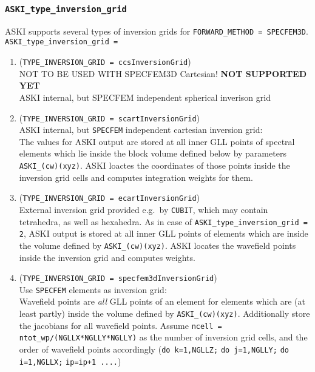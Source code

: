 \documentclass[12pt,a4paper]{article}
\newcommand{\lcode}[1]{\nolinkurl{#1}}
\newcommand{\ASKI}{ {\ttfamily ASKI} }
\begin{document}
\subsubsection*{\lcode{ASKI_type_inversion_grid}}
ASKI supports several types of inversion grids for \lcode{FORWARD_METHOD = SPECFEM3D}.
\lcode{ASKI_type_inversion_grid = }
\begin{enumerate}
\item (\lcode{TYPE_INVERSION_GRID = ccsInversionGrid}) \\ 
  NOT TO BE USED WITH SPECFEM3D Cartesian! {\bf NOT SUPPORTED YET}\\
  ASKI internal, but SPECFEM independent spherical inverison grid
\item (\lcode{TYPE_INVERSION_GRID = scartInversionGrid})\\
  \ASKI internal, but \lcode{SPECFEM} independent cartesian inversion grid:\\
  The values for \ASKI output are stored at all inner GLL points of spectral elements which lie
  inside the block volume defined below by parameters \lcode{ASKI_(cw)(xyz)}.
  \ASKI loactes the coordinates of those points inside the inversion grid cells and computes
  integration weights for them.
\item (\lcode{TYPE_INVERSION_GRID = ecartInversionGrid}) \\
  External inversion grid provided e.g.\ by \lcode{CUBIT}, which may contain tetrahedra, as well as hexahedra.
  As in case of \lcode{ASKI_type_inversion_grid = 2}, \ASKI output is stored at all inner GLL points of elements
  which are inside the volume defined by \lcode{ASKI_(cw)(xyz)}.
  \ASKI locates the wavefield points inside the inversion grid and computes weights.
\item (\lcode{TYPE_INVERSION_GRID = specfem3dInversionGrid}) \\
  Use \lcode{SPECFEM} elements as inversion grid:\\
  Wavefield points are \emph{all} GLL points of an element for elements which are (at least partly) inside the 
  volume defined by \lcode{ASKI_(cw)(xyz)}. Additionally store the jacobians for all wavefield points.
  Assume \lcode{ncell = ntot_wp/(NGLLX*NGLLY*NGLLY)} as the number of inversion grid cells, and the order of 
  wavefield points accordingly (\lcode{do k=1,NGLLZ;} \lcode{do j=1,NGLLY;} \lcode{do i=1,NGLLX;} \lcode{ip=ip+1 ....})
\end{enumerate}
\end{document}
